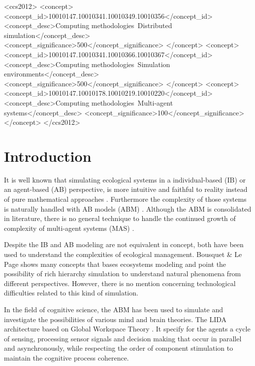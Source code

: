 \documentclass{aamas2017}
\begin{document}
\begin{CCSXML}
	<ccs2012>
	<concept>
	<concept_id>10010147.10010341.10010349.10010356</concept_id>
	<concept_desc>Computing methodologies~Distributed simulation</concept_desc>
	<concept_significance>500</concept_significance>
	</concept>
	<concept>
	<concept_id>10010147.10010341.10010366.10010367</concept_id>
	<concept_desc>Computing methodologies~Simulation environments</concept_desc>
	<concept_significance>500</concept_significance>
	</concept>
	<concept>
	<concept_id>10010147.10010178.10010219.10010220</concept_id>
	<concept_desc>Computing methodologies~Multi-agent systems</concept_desc>
	<concept_significance>100</concept_significance>
	</concept>
	</ccs2012>
\end{CCSXML}

\printccsdesc


\section{Introduction}
\label{sec:intro}
It is well known that simulating ecological systems in a individual-based (IB)  or an agent-based (AB) perspective, is more intuitive and faithful to reality instead of pure mathematical approaches \cite{Beecham1998}. Furthermore the complexity of those systems is naturally handled with AB models (ABM) \cite{An2012}.
Although the ABM is consolidated in literature, there is no general technique to handle the continued growth of complexity of multi-agent systems (MAS) \cite{An2012}. 

Despite the IB and AB modeling are not equivalent in concept, both have been used to understand the complexities of ecological management. Bousquet \& Le Page\cite{Bousquet2004} shows many concepts that bases ecosystems modeling and point the possibility of rich hierarchy simulation to understand natural phenomena from different perspectives. However, there is no mention concerning technological difficulties related to this kind of simulation.

In the field of cognitive science, the ABM has been used to  simulate and investigate the possibilities of various mind and brain theories. The LIDA architecture based on Global Workspace Theory \cite{Friedlander2008}. It specify for the agents a cycle of sensing, processing sensor signals and decision making that occur in parallel and asynchronously, while respecting the order of component stimulation to maintain the cognitive process coherence.
\end{document}
